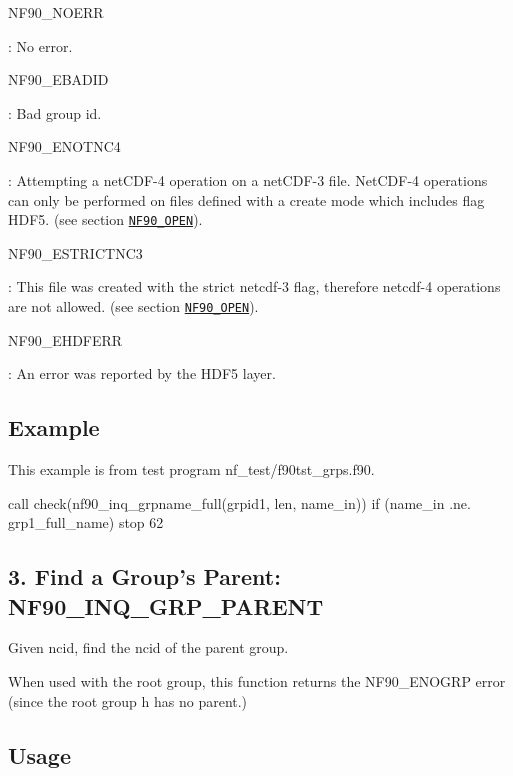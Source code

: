 {\ttfamily N\+F90\+\_\+\+N\+O\+E\+RR}

\+: No error.

{\ttfamily N\+F90\+\_\+\+E\+B\+A\+D\+ID}

\+: Bad group id.

{\ttfamily N\+F90\+\_\+\+E\+N\+O\+T\+N\+C4}

\+: Attempting a net\+C\+D\+F-\/4 operation on a net\+C\+D\+F-\/3 file. Net\+C\+D\+F-\/4 operations can only be performed on files defined with a create mode which includes flag H\+D\+F5. (see section \href{#NF90_005fOPEN}{\tt N\+F90\+\_\+\+O\+P\+EN}).

{\ttfamily N\+F90\+\_\+\+E\+S\+T\+R\+I\+C\+T\+N\+C3}

\+: This file was created with the strict netcdf-\/3 flag, therefore netcdf-\/4 operations are not allowed. (see section \href{#NF90_005fOPEN}{\tt N\+F90\+\_\+\+O\+P\+EN}).

{\ttfamily N\+F90\+\_\+\+E\+H\+D\+F\+E\+RR}

\+: An error was reported by the H\+D\+F5 layer.

\subsection*{Example}

This example is from test program nf\+\_\+test/f90tst\+\_\+grps.\+f90.


\begin{DoxyCode}
\textcolor{comment}{call check(nf90\_inq\_grpname\_full(grpid1, len, name\_in))}
\textcolor{keywordflow}{if} (name\_in .ne. grp1\_full\_name) stop 62
\end{DoxyCode}
\hypertarget{f90_groups_f90-find-a-groups-parent-nf90_inq_grp_parent}{}\subsection{3. Find a Group’s Parent\+: N\+F90\+\_\+\+I\+N\+Q\+\_\+\+G\+R\+P\+\_\+\+P\+A\+R\+E\+N\+T }\label{f90_groups_f90-find-a-groups-parent-nf90_inq_grp_parent}
Given ncid, find the ncid of the parent group.

When used with the root group, this function returns the N\+F90\+\_\+\+E\+N\+O\+G\+RP error (since the root group h has no parent.)

\subsection*{Usage}


